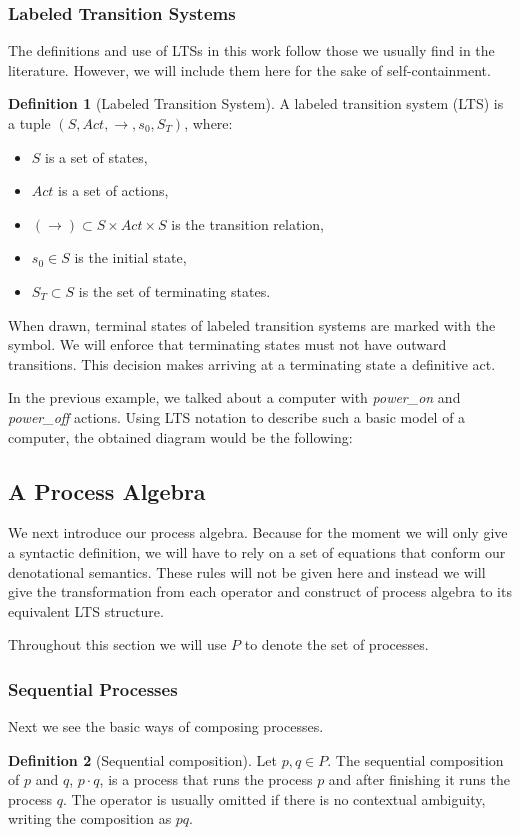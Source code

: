 \documentclass[11pt]{article}
\newcommand{\cmark}{\ding{51}}
\theoremstyle{definition}
\newtheorem{definition}{Definition}
\theoremstyle{plain}
\begin{document}
\subsubsection{Labeled Transition Systems}
The definitions and use of LTSs in this work follow those we usually find in the literature. However, we will include them here for the sake of self-containment.
\begin{definition} [Labeled Transition System]
	A labeled transition system (LTS) is a tuple $ (S,Act,\rightarrow,s_0,S_T)  $, where:
	\begin{itemize}
		\item $ S $ is a set of states,
		\item $ Act $ is a set of actions,
		\item $ (\rightarrow) \subset S \times Act \times S $ is the transition relation,
		\item $ s_0 \in S$ is the initial state,
		\item $ S_T \subset S $ is the set of terminating states.
	\end{itemize}
	When drawn, terminal states of labeled transition systems are marked with the \cmark symbol.
	We will enforce that terminating states must not have outward transitions. This decision makes arriving at a terminating state a definitive act. 
\end{definition}
In the previous example, we talked about a computer with \emph{power\_on} and \emph{power\_off} actions. Using LTS notation to describe such a basic model of a computer, the obtained diagram would be the following:

\subsection{A Process Algebra}
We next introduce our process algebra. Because for the moment we will only give a syntactic definition, we will have to rely on a set of equations that conform our denotational semantics. These rules will not be given here and instead we will give the transformation from each operator and construct of process algebra to its equivalent LTS structure.


Throughout this section we will use $ P $ to denote the set of processes.
\subsubsection{Sequential Processes}
Next we see the basic ways of composing processes.
\begin{definition} [Sequential composition]
	Let $ p, q \in P $. The sequential composition of $ p $ and $ q $, $ p \cdot q $, is a process that runs the process $ p $ and after finishing it runs the process $ q $. The operator is usually omitted if there is no contextual ambiguity, writing the composition as $ pq $.
\end{definition}
\end{document}
